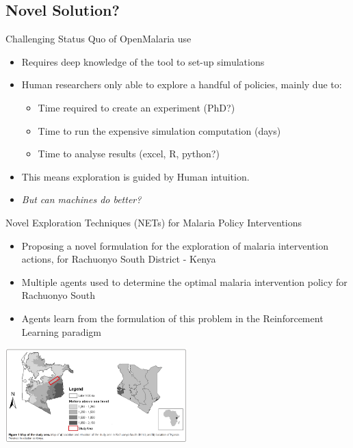 \documentclass{beamer}
\begin{document}
\subsection{Novel Solution?}

\begin{frame}{Challenging Status Quo of OpenMalaria use}

\begin{itemize}
\item Requires deep knowledge of the tool to set-up simulations
\item Human researchers only able to explore a handful of policies, mainly due to:

	\begin{itemize}
	\item Time required to create an experiment (PhD?)
	\item Time to run the expensive simulation computation (days)
	\item Time to analyse results (excel, R, python?)
	\end{itemize}

\item This means exploration is guided by Human intuition.
\item \textit{But can machines do better?}
\end{itemize}


\end{frame}

\begin{frame}{Novel Exploration Techniques (NETs) for Malaria Policy Interventions}

\begin{itemize}
\item Proposing a novel formulation for the exploration of malaria intervention actions, for Rachuonyo South District - Kenya 
\item Multiple agents used to determine the optimal malaria intervention policy for Rachuonyo South
\item Agents learn from the formulation of this problem in the Reinforcement Learning paradigm
\end{itemize}
\centering
         \includegraphics[width=7cm]{images/WesternKenya.png} 
\end{frame}
\end{document}
